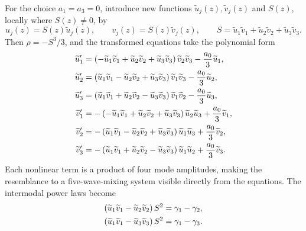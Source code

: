\documentclass[11pt,a4paper]{article}
\numberwithin{equation}{section}
\begin{document}
For the choice $a_1=a_3=0$, introduce new functions $\widetilde{u}_j(z),\widetilde{v}_j(z)$ and $S(z)$, locally where $S(z)\ne0$, by
\begin{equation}
    u_j(z)=S(z)\widetilde{u}_j(z),
    \qquad
    v_j(z)=S(z)\widetilde{v}_j(z),
    \qquad
    S
    =
    \widetilde{u}_1\widetilde{v}_1
    +
    \widetilde{u}_2\widetilde{v}_2
    +
    \widetilde{u}_3\widetilde{v}_3.
\end{equation}
Then $\rho=-S^3/3$, and the transformed equations take the polynomial form
\begin{align}
    \widetilde{u}_1'
    &=
    \left(
        -\widetilde{u}_1\widetilde{v}_1
        +\widetilde{u}_2\widetilde{v}_2
        +\widetilde{u}_3\widetilde{v}_3
    \right)
    \widetilde{v}_2\widetilde{v}_3
    -
    \frac{a_0}{3}\widetilde{u}_1,
    \notag \\
    \widetilde{u}_2'
    &=
    \left(
        \widetilde{u}_1\widetilde{v}_1
        -\widetilde{u}_2\widetilde{v}_2
        +\widetilde{u}_3\widetilde{v}_3
    \right)
    \widetilde{v}_1\widetilde{v}_3
    -
    \frac{a_0}{3}\widetilde{u}_2,
    \notag \\
    \widetilde{u}_3'
    &=
    \left(
        \widetilde{u}_1\widetilde{v}_1
        +\widetilde{u}_2\widetilde{v}_2
        -\widetilde{u}_3\widetilde{v}_3
    \right)
    \widetilde{v}_1\widetilde{v}_2
    -
    \frac{a_0}{3}\widetilde{u}_3,
    \notag \\
    \widetilde{v}_1'
    &=
    -\left(
        -\widetilde{u}_1\widetilde{v}_1
        +\widetilde{u}_2\widetilde{v}_2
        +\widetilde{u}_3\widetilde{v}_3
    \right)
    \widetilde{u}_2\widetilde{u}_3
    +
    \frac{a_0}{3}\widetilde{v}_1,
    \notag \\
    \widetilde{v}_2'
    &=
    -\left(
        \widetilde{u}_1\widetilde{v}_1
        -\widetilde{u}_2\widetilde{v}_2
        +\widetilde{u}_3\widetilde{v}_3
    \right)
    \widetilde{u}_1\widetilde{u}_3
    +
    \frac{a_0}{3}\widetilde{v}_2,
    \notag \\
    \widetilde{v}_3'
    &=
    -\left(
        \widetilde{u}_1\widetilde{v}_1
        +\widetilde{u}_2\widetilde{v}_2
        -\widetilde{u}_3\widetilde{v}_3
    \right)
    \widetilde{u}_1\widetilde{u}_2
    +
    \frac{a_0}{3}\widetilde{v}_3.
    \label{eq:three-mode-log-polynomial}
\end{align}
Each nonlinear term is a product of four mode amplitudes, making the resemblance to a five-wave-mixing system visible directly from the equations.
The intermodal power laws become
\begin{align}
    \left(
        \widetilde{u}_1\widetilde{v}_1
        -
        \widetilde{u}_2\widetilde{v}_2
    \right)S^2
    =
    \gamma_1-\gamma_2,
    \notag \\
    \left(
        \widetilde{u}_1\widetilde{v}_1
        -
        \widetilde{u}_3\widetilde{v}_3
    \right)S^2
    =
    \gamma_1-\gamma_3.
\end{align}
\end{document}
